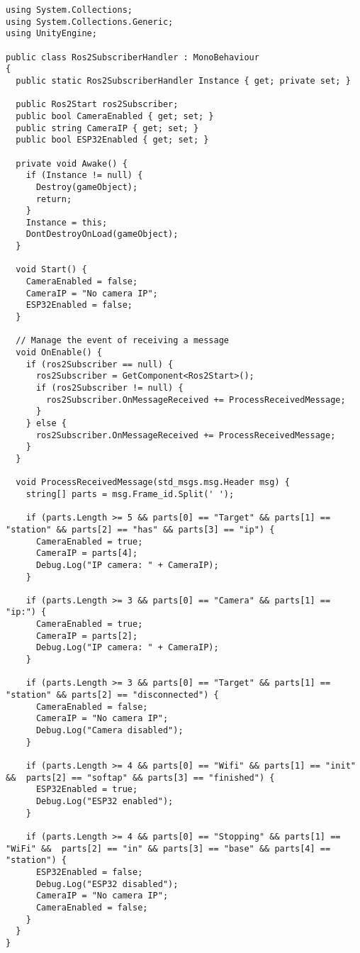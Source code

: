 \begin{lstlisting}[label=lst:Ros2SubscriberHandlerCode, caption={Código de Ros2SubscriberHandler}]
using System.Collections;
using System.Collections.Generic;
using UnityEngine;

public class Ros2SubscriberHandler : MonoBehaviour
{
  public static Ros2SubscriberHandler Instance { get; private set; }

  public Ros2Start ros2Subscriber;
  public bool CameraEnabled { get; set; }
  public string CameraIP { get; set; }
  public bool ESP32Enabled { get; set; }

  private void Awake() {
    if (Instance != null) {
      Destroy(gameObject);
      return;
    }
    Instance = this;
    DontDestroyOnLoad(gameObject);
  }

  void Start() {
    CameraEnabled = false;
    CameraIP = "No camera IP";
    ESP32Enabled = false;
  }

  // Manage the event of receiving a message
  void OnEnable() {
    if (ros2Subscriber == null) {
      ros2Subscriber = GetComponent<Ros2Start>();
      if (ros2Subscriber != null) {
        ros2Subscriber.OnMessageReceived += ProcessReceivedMessage;
      }
    } else {
      ros2Subscriber.OnMessageReceived += ProcessReceivedMessage;
    }
  }

  void ProcessReceivedMessage(std_msgs.msg.Header msg) {
    string[] parts = msg.Frame_id.Split(' ');

    if (parts.Length >= 5 && parts[0] == "Target" && parts[1] == "station" && parts[2] == "has" && parts[3] == "ip") {
      CameraEnabled = true;
      CameraIP = parts[4];
      Debug.Log("IP camera: " + CameraIP);
    }

    if (parts.Length >= 3 && parts[0] == "Camera" && parts[1] == "ip:") {
      CameraEnabled = true;
      CameraIP = parts[2];
      Debug.Log("IP camera: " + CameraIP);
    }

    if (parts.Length >= 3 && parts[0] == "Target" && parts[1] == "station" && parts[2] == "disconnected") {
      CameraEnabled = false;
      CameraIP = "No camera IP";
      Debug.Log("Camera disabled");
    }

    if (parts.Length >= 4 && parts[0] == "Wifi" && parts[1] == "init" &&  parts[2] == "softap" && parts[3] == "finished") {
      ESP32Enabled = true;
      Debug.Log("ESP32 enabled");
    }

    if (parts.Length >= 4 && parts[0] == "Stopping" && parts[1] == "WiFi" &&  parts[2] == "in" && parts[3] == "base" && parts[4] == "station") {
      ESP32Enabled = false;
      Debug.Log("ESP32 disabled");
      CameraIP = "No camera IP";
      CameraEnabled = false;
    }
  }
}
\end{lstlisting}


